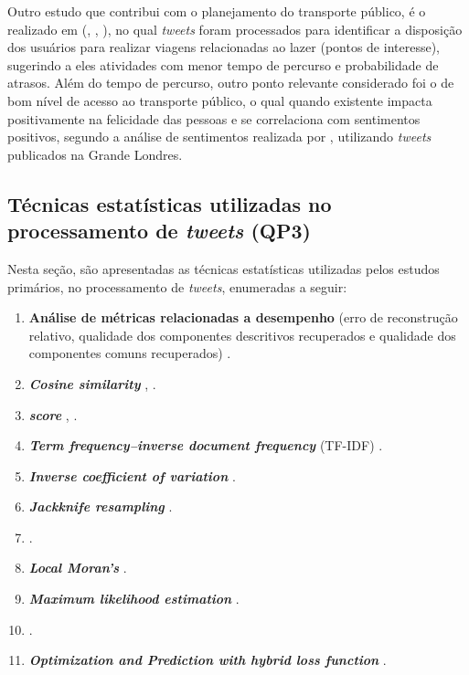 \documentclass[
	12pt,				%
	oneside,			%
	a4paper,			%
	english,			%
	brazil				%
	]{abntex2ppgsi}
\begin{document}
Outro estudo que contribui com o planejamento do transporte público, é o realizado em (\citeauthor{Gkiotsalitis2015}, \citeyear{Gkiotsalitis2015}, \citeyear{Gkiotsalitis2016}), no qual \textit{tweets} foram processados para identificar a disposição dos usuários para realizar viagens relacionadas ao lazer (pontos de interesse), sugerindo a eles atividades com menor tempo de percurso e probabilidade de atrasos. Além do tempo de percurso, outro ponto relevante considerado foi o de bom nível de acesso ao transporte público, o qual quando existente impacta positivamente na felicidade das pessoas e se correlaciona com sentimentos positivos, segundo a análise de sentimentos realizada por \cite{Guo2016}, utilizando \textit{tweets} publicados na Grande Londres.

\subsection{Técnicas estatísticas utilizadas no processamento de \textit{tweets} (QP3)}
Nesta seção, são apresentadas as técnicas estatísticas utilizadas pelos estudos primários, no processamento de \textit{tweets}, enumeradas a seguir:

\begin{enumerate}
\item \textbf{Análise de métricas relacionadas a desempenho} (erro de reconstrução relativo, qualidade dos componentes descritivos recuperados e qualidade dos componentes comuns recuperados) \cite{Wen2016}.
\item \textit{\textbf{Cosine similarity}} \cite{Yousaf2014}, \cite{Frias-Martinez2014}.
\item \textbf{\textit{ score}} \cite{Anantharam2015}, \cite{Chen2016}.
\item \textit{\textbf{Term frequency–inverse document frequency}} (TF-IDF) \cite{Mukherjee2015}.
\item \textit{\textbf{Inverse coefficient of variation}} \cite{Bendler2014}.
\item \textit{\textbf{Jackknife resampling}} \cite{Bendler2014}.
\item {} \cite{Steiger2015Census}.
\item \textit{\textbf{Local Moran's}} \cite{Steiger2015Census}.
\item \textit{\textbf{Maximum likelihood estimation}} \cite{Mukherjee2015}.
\item {} \cite{Ni2016}.
\item \textit{\textbf{Optimization and Prediction with hybrid loss function}} \cite{Ni2016}.
\end{enumerate}
 
\end{document}
